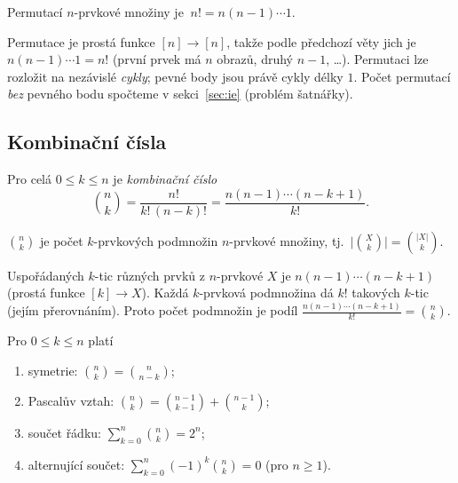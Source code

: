 \documentclass[11pt,a4paper]{article}
\begin{document}
\begin{veta}
Permutací $n$-prvkové množiny je $\ n!=n(n-1)\cdots1$.
\end{veta}

\begin{intuice}
Permutace je prostá funkce $[n]\to[n]$, takže podle předchozí věty jich je $n(n-1)\cdots1=n!$ (první prvek má $n$ obrazů, druhý $n-1$, \dots). Permutaci lze rozložit na nezávislé \emph{cykly}; pevné body jsou právě cykly délky $1$. Počet permutací \emph{bez} pevného bodu spočteme v sekci~\ref{sec:ie} (problém šatnářky).
\end{intuice}

\subsection{Kombinační čísla}

\begin{definice}
Pro celá $0\le k\le n$ je \emph{kombinační číslo}
\[
\binom{n}{k}=\frac{n!}{k!\,(n-k)!}=\frac{n(n-1)\cdots(n-k+1)}{k!}.
\]
\end{definice}

\begin{veta}
$\binom{n}{k}$ je počet $k$-prvkových podmnožin $n$-prvkové množiny, tj.\ $\big|\binom{X}{k}\big|=\binom{|X|}{k}$.
\end{veta}

\begin{intuice}
Uspořádaných $k$-tic různých prvků z $n$-prvkové $X$ je $n(n-1)\cdots(n-k+1)$ (prostá funkce $[k]\to X$). Každá $k$-prvková podmnožina dá $k!$ takových $k$-tic (jejím přerovnáním). Proto počet podmnožin je podíl $\frac{n(n-1)\cdots(n-k+1)}{k!}=\binom{n}{k}$.
\end{intuice}

\begin{veta}
Pro $0\le k\le n$ platí
\begin{enumerate}[label=(\arabic*)]
  \item symetrie: $\displaystyle\binom{n}{k}=\binom{n}{n-k}$;
  \item Pascalův vztah: $\displaystyle\binom{n}{k}=\binom{n-1}{k-1}+\binom{n-1}{k}$;
  \item součet řádku: $\displaystyle\sum_{k=0}^{n}\binom{n}{k}=2^{n}$;
  \item alternující součet: $\displaystyle\sum_{k=0}^{n}(-1)^k\binom{n}{k}=0$ (pro $n\ge1$).
\end{enumerate}
\end{veta}
\end{document}
